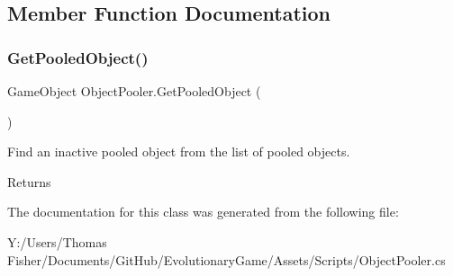 \subsection{Member Function Documentation}
\mbox{\label{class_object_pooler_a101205cb37c92020450d499bc8f2bad3}} 
\subsubsection{\texorpdfstring{Get\+Pooled\+Object()}{GetPooledObject()}}
{\footnotesize\ttfamily Game\+Object Object\+Pooler.\+Get\+Pooled\+Object (\begin{DoxyParamCaption}{ }\end{DoxyParamCaption})}



Find an inactive pooled object from the list of pooled objects. 

\begin{DoxyReturn}{Returns}

\end{DoxyReturn}


The documentation for this class was generated from the following file\+:\begin{DoxyCompactItemize}
\item 
Y\+:/\+Users/\+Thomas Fisher/\+Documents/\+Git\+Hub/\+Evolutionary\+Game/\+Assets/\+Scripts/Object\+Pooler.\+cs\end{DoxyCompactItemize}
